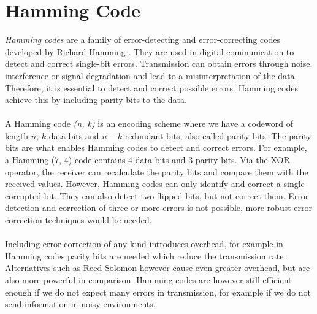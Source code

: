\section{Hamming Code}
\textit{Hamming codes} are a family of error-detecting and error-correcting codes developed by Richard Hamming \cite{hamming1950error}. They are used in digital communication to detect and correct single-bit errors. Transmission can obtain errors through noise, interference or signal degradation and lead to a misinterpretation of the data. Therefore, it is essential to detect and correct possible errors. Hamming codes achieve this by including parity bits to the data.
\\ \\
A Hamming code \textit{(n, k)} is an encoding scheme where we have a codeword of length $n$, $k$ data bits and $n-k$ redundant bits, also called parity bits. The parity bits are what enables Hamming codes to detect and correct errors. For example, a Hamming (7, 4) code contains 4 data bits and 3 parity bits. Via the XOR operator, the receiver can recalculate the parity bits and compare them with the received values. However, Hamming codes can only identify and correct a single corrupted bit. They can also detect two flipped bits, but not correct them. Error detection and correction of three or more errors is not possible, more robust error correction techniques would be needed. 
\\ \\
Including error correction of any kind introduces overhead, for example in Hamming codes parity bits are needed which reduce the transmission rate. Alternatives such as Reed-Solomon however cause even greater overhead, but are also more powerful in comparison. Hamming codes are however still efficient enough if we do not expect many errors in transmission, for example if we do not send information in noisy environments.